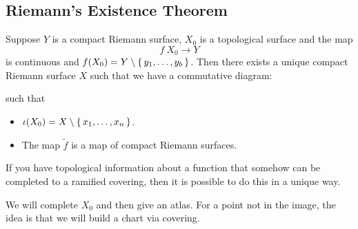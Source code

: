 \documentclass[12pt]{memoir}
\begin{document}
\subsection{Riemann's Existence Theorem}

\begin{Th}
    Suppose $Y$ is a compact Riemann surface, $X_0$ is a topological surface and the map
    $$f\: X_0\to Y$$
    is continuous and $f(X_0)=Y\setminus\{\,y_1,\dots,y_b\,\}$. Then there exists a unique compact Riemann surface $X$ such that we have a commutative diagram:
\begin{center}
\end{center}
such that 
\begin{itemize}
    \item $\iota(X_0)=X\setminus\{\,x_1,\dots,x_n\,\}$.
    \item The map $\tilde{f}$ is a map of compact Riemann surfaces.
\end{itemize}
\end{Th}

If you have topological information about a function that somehow can be completed to a ramified covering, then it is possible to do this in a unique way.\par
We will complete $X_0$ and then give an atlas. For a point not in the image, the idea is that we will build a chart via covering. 
\end{document}

